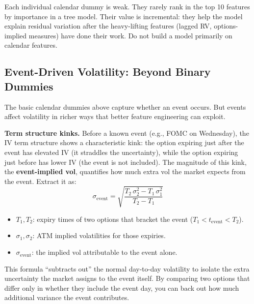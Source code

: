 \begin{warning}
Each individual calendar dummy is weak.
They rarely rank in the top 10 features by importance in a tree model.
Their value is incremental: they help the model explain residual variation after the heavy-lifting features (lagged RV, options-implied measures) have done their work.
Do not build a model primarily on calendar features.
\end{warning}

\subsection{Event-Driven Volatility: Beyond Binary Dummies}\label{sec:feat-event-vol}

The basic calendar dummies above capture whether an event occurs.
But events affect volatility in richer ways that better feature engineering can exploit.

\textbf{Term structure kinks.}
Before a known event (e.g., FOMC on Wednesday), the IV term structure shows a characteristic kink: the option expiring just after the event has elevated IV (it straddles the uncertainty), while the option expiring just before has lower IV (the event is not included).
The magnitude of this kink, the \textbf{event-implied vol}, quantifies how much extra vol the market expects from the event.
Extract it as:
\begin{equation}\label{eq:event-implied-vol}
  \sigma_{\text{event}} = \sqrt{\frac{T_2\,\sigma_2^2 - T_1\,\sigma_1^2}{T_2 - T_1}}
\end{equation}
\begin{itemize}[nosep]
  \item $T_1, T_2$: expiry times of two options that bracket the event ($T_1 < t_{\text{event}} < T_2$).
  \item $\sigma_1, \sigma_2$: ATM implied volatilities for those expiries.
  \item $\sigma_{\text{event}}$: the implied vol attributable to the event alone.
\end{itemize}

\begin{intuition}
This formula ``subtracts out'' the normal day-to-day volatility to isolate the extra uncertainty the market assigns to the event itself. By comparing two options that differ only in whether they include the event day, you can back out how much additional variance the event contributes.
\end{intuition}

